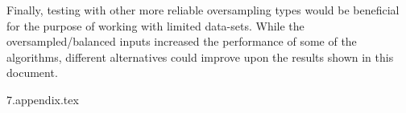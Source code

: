 \documentclass[a4paper,fleqn,usenatbib]{mnras}
\begin{document}
Finally, testing with other more reliable oversampling types would be beneficial for the purpose of working with limited data-sets. While the oversampled/balanced inputs increased the performance of some of the algorithms, different alternatives could improve upon the results shown in this document.













\appendix
{7.appendix.tex}




\label{lastpage}
\end{document}
